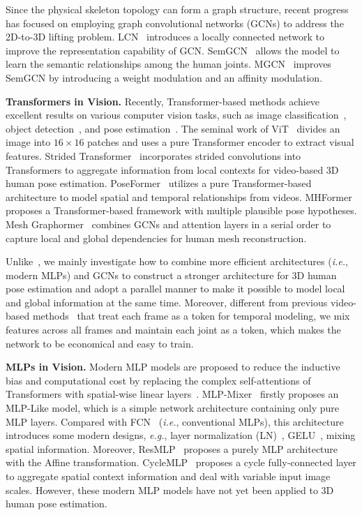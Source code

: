 \documentclass[lettersize,journal]{IEEEtran}
\begin{document}
Since the physical skeleton topology can form a graph structure, recent progress has focused on employing graph convolutional networks (GCNs) to address the 2D-to-3D lifting problem. 
LCN~\cite{ci2019optimizing} introduces a locally connected network to improve
the representation capability of GCN. 
SemGCN~\cite{zhao2019semantic} allows the model to learn the semantic relationships among the human joints. 
MGCN~\cite{zou2021modulated} improves SemGCN by introducing a weight modulation and an affinity modulation. 

\noindent \textbf{Transformers in Vision.}
Recently, Transformer-based methods achieve excellent results on various computer vision tasks, such as image classification~\cite{vit,swin,wang2021pyramid}, object detection~\cite{dert,zhu2020deformable,zhao2022tracking}, and pose estimation~\cite{meshgraphormer,poseformer,strided,mhformer}. 
The seminal work of ViT~\cite{vit} divides an image into $16 {\times} 16$ patches and uses a pure Transformer encoder to extract visual features. 
Strided Transformer~\cite{strided} incorporates strided convolutions into Transformers to aggregate information from local contexts for video-based 3D human pose estimation. 
PoseFormer~\cite{poseformer} utilizes a pure Transformer-based architecture to model spatial and temporal relationships from videos. 
MHFormer~\cite{mhformer} proposes a Transformer-based framework with multiple plausible pose hypotheses. 
Mesh Graphormer~\cite{meshgraphormer} combines GCNs and attention layers in a serial order to capture local and global dependencies for human mesh reconstruction. 

Unlike~\cite{meshgraphormer}, we mainly investigate how to combine more efficient architectures (\emph{i.e.}, modern MLPs) and GCNs to construct a stronger architecture for 3D human pose estimation and adopt a parallel manner to make it possible to model local and global information at the same time. 
Moreover, different from previous video-based methods~\cite{poseformer,strided,mhformer} that treat each frame as a token for temporal modeling, we mix features across all frames and maintain each joint as a token, which makes the network to be economical and easy to train. 

\noindent \textbf{MLPs in Vision.}
Modern MLP models are proposed to reduce the inductive bias and computational cost by replacing the complex self-attentions of Transformers with spatial-wise linear layers~\cite{lian2021mlp,liu2021pay,ren2021cascaded,shi2022polyp}. 
MLP-Mixer~\cite{mlpmixer} firstly proposes an MLP-Like model, which is a simple network architecture containing only pure MLP layers. 
Compared with FCN~\cite{simplebaseline} (\emph{i.e.}, conventional MLPs), this architecture introduces some modern designs, \emph{e.g.}, layer normalization (LN)~\cite{ba2016layer}, GELU~\cite{hendrycks2016gaussian}, mixing spatial information. 
Moreover, ResMLP~\cite{touvron2021resmlp} proposes a purely MLP architecture with the Affine transformation. 
CycleMLP~\cite{chen2022cyclemlp} proposes a cycle fully-connected layer to aggregate spatial context information and deal with variable
input image scales. 
However, these modern MLP models have not yet been applied to 3D human pose estimation. 
\end{document}

